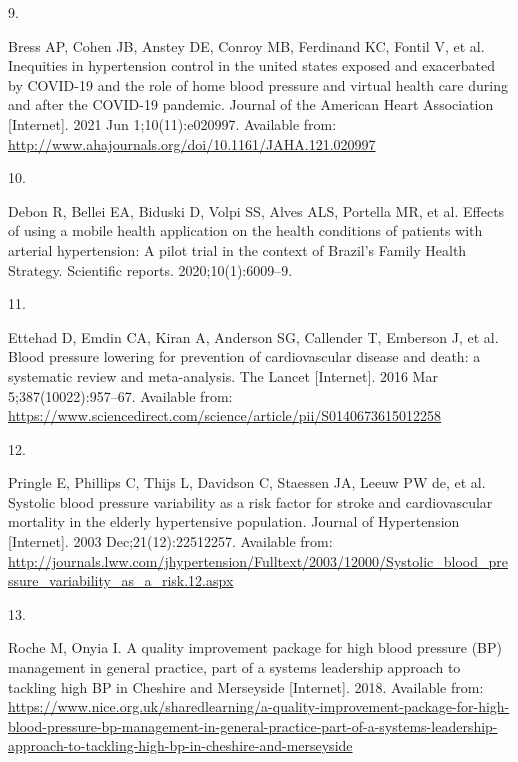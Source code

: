 \documentclass[
]{article}
\newlength{\cslhangindent}
\newlength{\csllabelwidth}
\newlength{\cslentryspacingunit} %
\newenvironment{CSLReferences}[2] %
 {%
  \setlength{\parindent}{0pt}
  \ifodd #1
  \let\oldpar\par
  \def\par{\hangindent=\cslhangindent\oldpar}
  \fi
  \setlength{\parskip}{#2\cslentryspacingunit}
 }%
 {}
\newcommand{\CSLLeftMargin}[1]{\parbox[t]{\csllabelwidth}{#1}}
\newcommand{\CSLRightInline}[1]{\parbox[t]{\linewidth - \csllabelwidth}{#1}\break}
\begin{document}
\begin{CSLReferences}{0}{0}
\leavevmode{}%
\CSLLeftMargin{9. }%
\CSLRightInline{Bress AP, Cohen JB, Anstey DE, Conroy MB, Ferdinand KC,
Fontil V, et al. Inequities in hypertension control in the united states
exposed and exacerbated by COVID{-}19 and the role of home blood
pressure and virtual health care during and after the COVID{-}19
pandemic. Journal of the American Heart Association {[}Internet{]}. 2021
Jun 1;10(11):e020997. Available from:
\url{http://www.ahajournals.org/doi/10.1161/JAHA.121.020997}}

\leavevmode{}%
\CSLLeftMargin{10. }%
\CSLRightInline{Debon R, Bellei EA, Biduski D, Volpi SS, Alves ALS,
Portella MR, et al. Effects of using a mobile health application on the
health conditions of patients with arterial hypertension: A pilot trial
in the context of Brazil's Family Health Strategy. Scientific reports.
2020;10(1):6009--9. }

\leavevmode{}%
\CSLLeftMargin{11. }%
\CSLRightInline{Ettehad D, Emdin CA, Kiran A, Anderson SG, Callender T,
Emberson J, et al. Blood pressure lowering for prevention of
cardiovascular disease and death: a systematic review and meta-analysis.
The Lancet {[}Internet{]}. 2016 Mar 5;387(10022):957--67. Available
from:
\url{https://www.sciencedirect.com/science/article/pii/S0140673615012258}}

\leavevmode{}%
\CSLLeftMargin{12. }%
\CSLRightInline{Pringle E, Phillips C, Thijs L, Davidson C, Staessen JA,
Leeuw PW de, et al. Systolic blood pressure variability as a risk factor
for stroke and cardiovascular mortality in the elderly hypertensive
population. Journal of Hypertension {[}Internet{]}. 2003
Dec;21(12):22512257. Available from:
\url{http://journals.lww.com/jhypertension/Fulltext/2003/12000/Systolic_blood_pressure_variability_as_a_risk.12.aspx}}

\leavevmode{}%
\CSLLeftMargin{13. }%
\CSLRightInline{Roche M, Onyia I. A quality improvement package for high
blood pressure (BP) management in general practice, part of a systems
leadership approach to tackling high BP in Cheshire and Merseyside
{[}Internet{]}. 2018. Available from:
\url{https://www.nice.org.uk/sharedlearning/a-quality-improvement-package-for-high-blood-pressure-bp-management-in-general-practice-part-of-a-systems-leadership-approach-to-tackling-high-bp-in-cheshire-and-merseyside}}


\end{CSLReferences}
\end{document}
